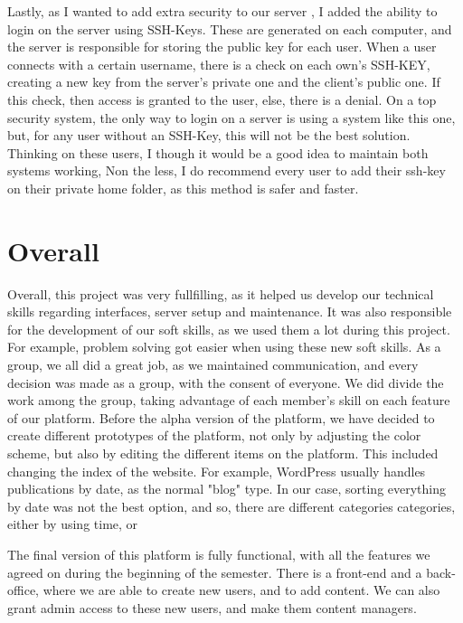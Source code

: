 \documentclass[a4paper,12pt,journal,twoside,compsoc]{PPIEEEtran}
\begin{document}
Lastly, as I wanted to add extra security to our server , I added the ability to login on the server using SSH-Keys. These are generated on each computer, and the server is responsible for storing the public key for each user. When a user connects with a certain username, there is a check on each own's SSH-KEY, creating a new key from the server's private one and the client's public one. If this check, then access is granted to the user, else, there is a denial.
On a top security system, the only way to login on a server is using a system like this one, but, for any user without an SSH-Key, this will not be the best solution. Thinking on these users, I though it would be a good idea to maintain both systems working, Non the less, I do recommend every user to add their ssh-key on their private home folder, as this method is safer and faster.
	
\section{Overall}
Overall, this project was very fullfilling, as it helped us develop our technical skills regarding interfaces, server setup and maintenance. It was also responsible for the development of our soft skills, as we used them a lot during this project. For example, problem solving got easier when using these new soft skills.
As a group, we all did a great job, as we maintained communication, and every decision was made as a group, with the consent of everyone.
We did divide the work among the group, taking advantage of each member's skill on each feature of our platform.
Before the alpha version of the platform, we have decided to create different prototypes of the platform, not only by adjusting the color scheme, but also by editing the different items on the platform. This included changing the index of the website. For example, WordPress usually handles publications by date, as the normal "blog" type. In our case, sorting everything by date was not the best option, and so, there are different categories  categories, either by using time, or 



The final version of this platform is fully functional, with all the features we agreed on during the beginning of the semester. There is a front-end and a back-office, where we are able to create new users, and to add content. We can also grant admin access to these new users, and make them content managers.
\end{document}
